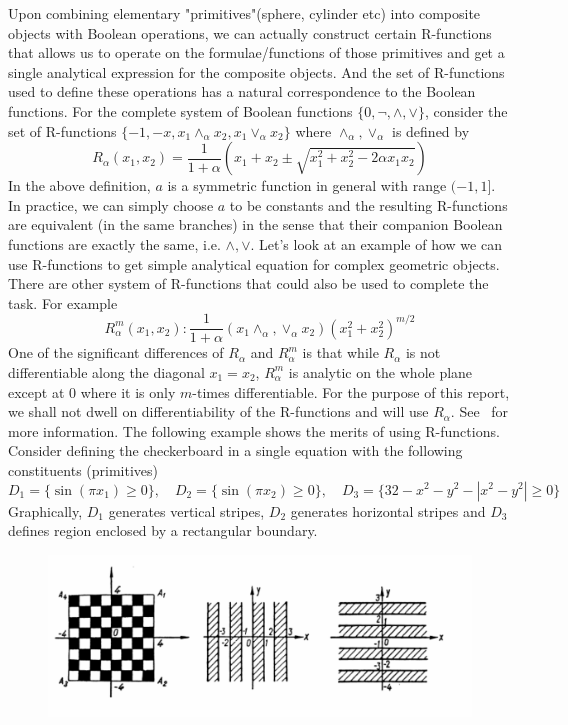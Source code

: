 \documentclass[11pt]{amsart}
\theoremstyle{definition}
\begin{document}
Upon combining elementary "primitives"(sphere, cylinder etc) into composite objects with Boolean operations, we can actually construct certain R-functions that allows us to operate on the formulae/functions of those primitives and get a single analytical expression for the composite objects. And the set of R-functions used to define these operations has a natural correspondence to the Boolean functions. For the complete system of Boolean functions $\{0, \neg, \wedge, \vee\}$, consider the set of R-functions $\{-1,-x, x_1\wedge_\alpha x_2, x_1\vee_\alpha x_2\}$ where $\wedge_\alpha, \vee_\alpha$ is defined by
$$R_\alpha(x_1,x_2)=\frac{1}{1+\alpha} (x_1+x_2\pm \sqrt{x_1^2+x_2^2-2\alpha x_1x_2})$$
In the above definition, $a$ is a symmetric function in general with range $(-1,1]$. In practice, we can simply choose $a$ to be constants and the resulting R-functions are equivalent (in the same branches) in the sense that their companion Boolean functions are exactly the same, i.e. $\wedge,\vee$. Let's look at an example of how we can use R-functions to get simple analytical equation for complex geometric objects. There are other system of R-functions that could also be used to complete the task. For example
$$R_{\alpha}^m(x_1,x_2): \frac{1}{1+\alpha} (x_1 \wedge_\alpha ,\vee_\alpha x_2)(x_1^2+x_2^2)^{m/2}$$
One of the significant differences of $R_\alpha$ and $R_{\alpha}^{m}$ is that while $R_\alpha$ is not differentiable along the diagonal $x_1=x_2$, $R_{\alpha}^m$ is analytic on the whole plane except at $0$ where it is only $m$-times differentiable. For the purpose of this report, we shall not dwell on differentiability of the R-functions and will use $R_\alpha$. See~\cite{Shapiro} for more information.
The following example shows the merits of using R-functions. Consider defining the checkerboard in a single equation with the following constituents (primitives) 
$$D_1=\{\sin(\pi x_1)\geq 0\}, \quad D_2=\{\sin(\pi x_2)\geq 0\},\quad D_3=\{32-x^2-y^2-|x^2-y^2|\geq 0\}$$ 
Graphically, $D_1$ generates vertical stripes, $D_2$ generates horizontal stripes and $D_3$ defines region enclosed by a rectangular boundary. 
\begin{figure}[H]
\includegraphics[width=\textwidth]{./figs/checkerboard.pdf}
\end{figure}
\end{document}
